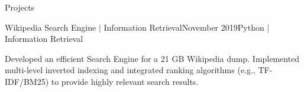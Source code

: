 





\begin{cvsection}{Projects}

\begin{rSubsection}{\fontsize{12pt}{10pt} \selectfont Wikipedia Search Engine $|$ Information Retrieval}{November 2019}{Python | Information Retrieval}{}
\item Developed an efficient Search Engine for a 21 GB Wikipedia dump. Implemented multi-level inverted indexing and integrated ranking algorithms (e.g., TF-IDF/BM25) to provide highly relevant search results.
\end{rSubsection}





\end{cvsection}
